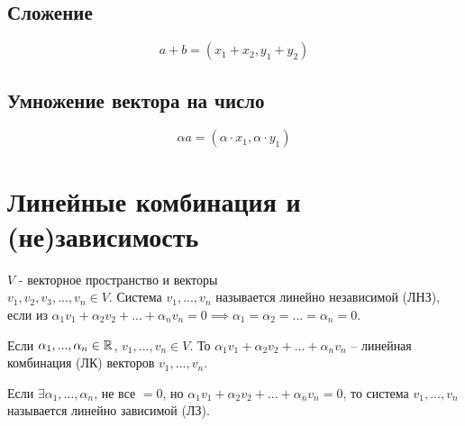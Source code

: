 \documentclass[main]{subfiles}
\begin{document}
\subsection{Сложение}
\begin{equation*}
    a + b = (x_1+x_2, y_1+y_2)
\end{equation*}

\subsection{Умножение вектора на число}
\begin{equation*}
    \alpha a = (\alpha\cdot x_1, \alpha\cdot y_1)
\end{equation*}

\section{Линейные комбинация и (не)зависимость}
\begin{definition}
    $V$ - векторное пространство и векторы \\ $v_1,v_2,v_3,..., v_n \in V$.
    Система $v_1,...,v_n$ называется линейно независимой (ЛНЗ), если из
    $\alpha_1 v_1 + \alpha_2 v_2 + ... + \alpha_n v_n = 0 \implies \alpha_1=\alpha_2=...=\alpha_n =0$.
\end{definition}

\begin{definition}
    Если $\alpha_1,..., \alpha_n \in \mathbb{R}$, $v_1,...,v_n \in V$.
    То $\alpha_1 v_1 + \alpha_2 v_2 + ... + \alpha_n v_n$ -- линейная комбинация (ЛК)
    векторов $v_1,...,v_n$.
\end{definition}

\begin{definition}
    Если $\exists \alpha_1,..., \alpha_n$, не все $=0$, но $\alpha_1 v_1 + \alpha_2 v_2 + ... + \alpha_n v_n = 0$,
    то система $v_1,...,v_n$ называется линейно зависимой (ЛЗ).
\end{definition}
\end{document}
